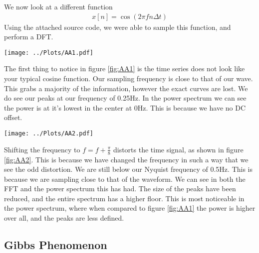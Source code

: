 \documentclass[twocolumn]{myarticle}
\begin{document}
We now look at a different function 
\begin{align}
    x[n] = \cos\left(2\pi f n\Delta t\right)
\end{align}
Using the attached source code, we were able to sample this function, and perform a DFT.

\begin{figure*}[htpb]
    \centering
    \texttt{[image: ../Plots/AA1.pdf]}
    \caption{%
        DFT of $x[n]=\cos(2\pi fn\Delta t)$. Top figure showing the sampled time series, the middle showing the DFT, and the bottom displaying the power in dB.
    }
    \label{fig:AA1}
\end{figure*}

The first thing to notice in figure \ref{fig:AA1} is the time series does not look like your typical cosine function. 
Our sampling frequency is close to that of our wave. 
This grabs a majority of the information, however the exact curves are lost. 
We do see our peaks at our frequency of 0.25Hz. 
In the power spectrum we can see the power is at it's lowest in the center at 0Hz. 
This is because we have no DC offset. 

\begin{figure*}[htpb]
    \centering
    \texttt{[image: ../Plots/AA2.pdf]}
    \caption{%
        DFT of the modified cosine of $x[n]=\cos(2\pi (f+0.008) + n\Delta t)$. Top figure showing the sampled time series, the middle showing the DFT, and the bottom displaying the power in dB.
    }
    \label{fig:AA2}
\end{figure*}
Shifting the frequency to $f=f+\frac{\pi}{8}$ distorts the time signal, as shown in figure \ref{fig:AA2}. 
This is because we have changed the frequency in such a way that we see the odd distortion. 
We are still below our Nyquist frequency of 0.5Hz. 
This is because we are sampling close to that of the waveform. 
We can see in both the FFT and the power spectrum this has had. 
The size of the peaks have been reduced, and the entire spectrum has a higher floor. 
This is most noticeable in the power spectrum, where when compared to figure \ref{fig:AA1} the power is higher over all, and the peaks are less defined.   

\subsection{Gibbs Phenomenon}
\label{sec:gibbs_phenomenon}
\end{document}

